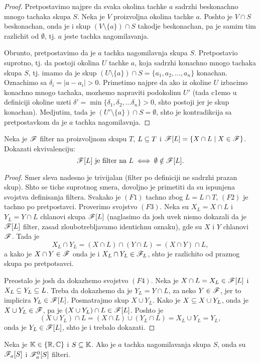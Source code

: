 \documentclass[../maing.tex]{subfiles}
\begin{document}
    \begin{proof}
        Pretpostavimo najpre da svaka okolina tachke $a$ sadrzhi beskonachno mnogo tachaka skupa $S$. Neka je $V$ proizvoljna okolina tachke $a$. 
	Poshto je $V\cap S$ beskonachan, onda je i skup $(V\setminus\{a\}) \cap S$ takodje beskonachan, pa je samim tim razlichit od $\emptyset$,
	tj. $a$ jeste tachka nagomilavanja. 

	Obrunto, pretpostavimo da je $a$ tachka nagomilavnja skupa $S$. Pretpostavio suprotno, tj. da postoji okolina $U$ tachke $a$,
	koja sadrzhi konachno mnogo tachaka skupa $S$, tj. imamo da je skup $(U\setminus\{a\})\cap S=\{a_1,a_2,...,a_n\}$ konachan. 
	Oznachimo sa $\delta_i=|a-a_i|>0$.
	Primetimo najpre da ako iz okoline $U$ izbacimo konachno mnogo tachaka, mozhemo napraviti podokolinu
	$U'$ (tada c1emo u definiciji okoline uzeti $\delta'=\min\{\delta_1,\delta_2,...\delta_n\}>0$, shto postoji jer je skup konachan). 
	Medjutim, tada je $(U'\setminus\{a\})\cap S=\emptyset$, shto je kontradikcija sa pretpostavkom da je $a$ tachka nagomilavnja.
    \end{proof}

    \begin{st}
    	Neka je $\mathscr{F}$ filter na proizvoljnom skupu $T$, $L\subseteq T$ i $\mathscr{F}[L]=\{X\cap L\mid X \in \mathscr{F}\}$. Dokazati ekvivalenciju:
	\[\mathscr{F}[L] \text{ je filter na } L \iff \emptyset \notin \mathscr{F}[L].\]
    \end{st}
    \begin{proof}
    	Smer sleva nadesno je trivijalan (filter po definiciji ne sadrzhi prazan skup). 
	Shto se tiche suprotnog smera, dovoljno je primetiti da su ispunjena svojstva definisanja filtera.
	Svakako je $(F1)$ tachno zbog $L=L\cap T$, $(F2)$ je tachno po pretpostavci. Proverimo svojstvo $(F3)$. 
	Neka su $X_L=X\cap L$ i $Y_L=Y\cap L$ chlanovi skupa $\mathscr{F}[L]$ (naglasimo da josh uvek nismo dokazali da je $\mathscr{F}[L]$ filter, 
	zasad zloubotrebljavamo identichnu oznaku), gde su $X$ i $Y$ chlanovi $\mathscr{F}$.
	Tada je \[X_L \cap Y_L = (X\cap L) \cap (Y\cap L) = (X\cap Y)\cap L,\]
	a kako je $X\cap Y \in \mathscr{F}$ onda je i $X_L\cap Y_L\in \mathscr{F}_L$, shto je razlichito od praznog skupa po pretpotsavci.

	Preostalo je josh da dokazhemo svojstvo $(F4)$. Neka je $X\cap L=X_L\in \mathscr{F}[L]$ i $X_L\subseteq Y_L\subseteq L$. Treba da dokazhemo da je $Y_L=Y\cap L$, za neko $Y \in \mathscr{F}$, jer to implicira $Y_L \in \mathscr{F}[L]$.
	Posmatrajmo skup $X\cup Y_L$. Kako je $X\subseteq X\cup Y_L$, onda je $X\cup Y_L \in \mathscr{F}$, pa je $(X\cup Y_L)\cap L \in \mathscr{F}[L]$. Poshto je 
	\[(X\cup Y_L)\cap L=(X\cap L)\cup(Y_L\cap L)=X_L\cup Y_L=Y_L,\]
	onda je $Y_L\in \mathscr{F}[L]$, shto je i trebalo dokazati.
    \end{proof}
    \begin{posl}
    	\label{filterokolinaposl}
	Neka je $\mathbb{K}\in\{\mathbb{R},\mathbb{C}\}$ i $S\subseteq \mathbb{K}$. Ako je $a$ tachka nagomilavanja skupa $S$, onda su $\mathscr{F}_a[S]$ i $\mathscr{F}_a^0[S]$ filteri.	
    \end{posl}
\end{document}
